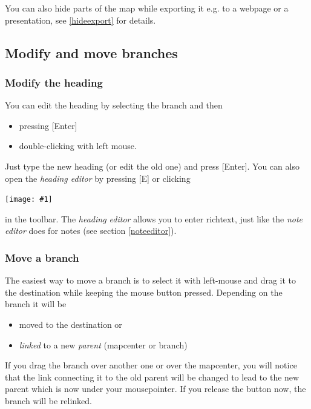 \documentclass[12pt,a4paper]{article}
\newcommand{\maximage}[1]{  
    \begin{center}
        \texttt{[image: \#1]} 
    \end{center}
}
\newcommand{\key}[1]{[#1]}
\begin{document}
You can also hide parts of the map while exporting it e.g. to a webpage
or a presentation, see \ref{hideexport} for details.

\subsection{Modify and move branches}
\subsubsection*{Modify the heading}  \label{editheading}
You can edit the heading by selecting the branch and then
\begin{itemize}
    \item pressing \key{Enter}
    \item double-clicking with left mouse.
\end{itemize}
Just type the new heading (or edit the old one) and press \key{Enter}.
You can also open the {\em heading editor} by pressing \key{E} or
clicking 
\maximage{images/headingeditor.png}
in the toolbar. The {\em heading editor} allows you to enter richtext, just
like the {\em note editor} does for notes (see section \ref{noteeditor}).

\subsubsection*{Move a branch}
The easiest way to move a branch is to select it with left-mouse and
drag it to the destination while keeping the mouse button pressed.
Depending on the branch  it will be
\begin{itemize}
    \item moved to the destination or
    \item {\em linked} to a new {\em parent} (mapcenter or branch)
\end{itemize}
If you drag the branch over another one or over the mapcenter, you will
notice that the  link connecting it to the old parent will be changed to
lead to the  new parent which is now under your mousepointer.  If you
release the button now, the branch will be relinked.
\end{document}
